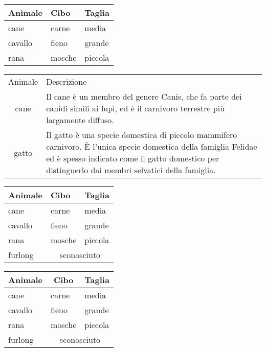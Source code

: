 \documentclass{article}
\begin{document}
\bigbreak

\begin{tabular}{lll}
    \toprule
    Animale & Cibo   & Taglia  \\
    \midrule
    cane    & carne  & media   \\
    \cmidrule{1-2}
    cavallo & fieno  & grande  \\
    \cmidrule(r){1-1}             
    \cmidrule(rl){2-2}            
    \cmidrule(l){3-3}         
    rana    & mosche & piccola \\
    \bottomrule
\end{tabular}

\bigbreak

\begin{tabular}{cp{9cm}}
    \toprule
    Animale  & Descrizione \\
    cane     & Il cane è un membro del genere Canis, che fa parte dei canidi 
               simili ai lupi, ed è il carnivoro terrestre più largamente 
               diffuso. \\  
    \addlinespace
    gatto    & Il gatto è una specie domestica di piccolo mammifero carnivoro. 
               È l'unica specie domestica della famiglia Felidae ed è spesso 
               indicato come il gatto domestico per distinguerlo dai membri 
               selvatici della famiglia. \\
    \bottomrule
\end{tabular}

\bigbreak

\begin{tabular}{lll}
    \toprule
    Animale   & Cibo   & Taglia  \\
    \midrule
    cane      & carne  & media   \\
    cavallo   & fieno  & grande  \\
    rana      & mosche & piccola \\
    furlong   & \multicolumn{2}{c}{sconosciuto} \\
    \bottomrule
\end{tabular}

\bigbreak

\begin{tabular}{lll}
    \toprule
    \multicolumn{1}{c}{Animale} & \multicolumn{1}{c}{Cibo} & \multicolumn{1}{c}{Taglia} \\
    \midrule
    cane      & carne  & media   \\
    cavallo   & fieno  & grande  \\
    rana      & mosche & piccola \\
    furlong   & \multicolumn{2}{c}{sconosciuto} \\
    \bottomrule
\end{tabular}
\end{document}
